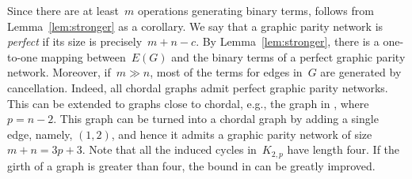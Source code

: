 \documentclass[a4paper,cleveref, autoref, 11pt, fleqn, thm-restate]{article}
\theoremstyle{plain}
\begin{document}
Since there are at least~$m$ operations generating binary terms,  follows from Lemma~\ref{lem:stronger} as a corollary.
We say that a graphic parity network is \emph{perfect} if its size is precisely~$m+n-c$.
By Lemma~\ref{lem:stronger}, there is a one-to-one mapping between~$E(G)$ and the binary terms of a perfect graphic parity network.  Moreover, if~$m \gg n$, most of the terms for edges in~$G$ are generated by cancellation.
Indeed, all chordal graphs admit perfect graphic parity networks.  This can be extended to graphs close to chordal, e.g., the graph in , where~$p = n - 2$.  This graph can be turned into a chordal graph by adding a single edge, namely, $(1, 2)$, and hence it admits a graphic parity network of size~$m + n = 3p + 3$.  Note that all the induced cycles in~$K_{2, p}$ have length four.
If the girth of a graph is greater than four, the bound in  can be greatly improved.
\end{document}
